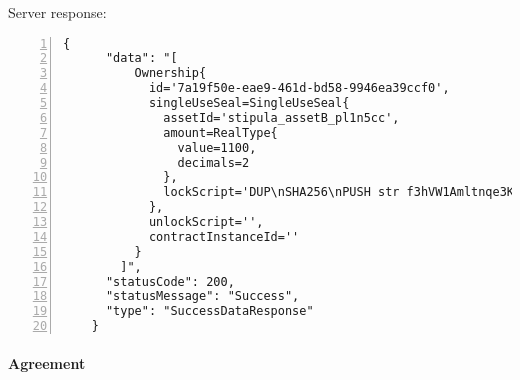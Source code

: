 Server response:
{
  \small
  \begin{Verbatim}[numbers=left,xleftmargin=1cm,firstnumber=1,breaklines=true,breakanywhere=true,tabsize=2]
    {
      "data": "[
          Ownership{
            id='7a19f50e-eae9-461d-bd58-9946ea39ccf0', 
            singleUseSeal=SingleUseSeal{
              assetId='stipula_assetB_pl1n5cc', 
              amount=RealType{
                value=1100, 
                decimals=2
              }, 
              lockScript='DUP\nSHA256\nPUSH str f3hVW1Amltnqe3KvOT00eT7AU23FAUKdgmCluZB+nss=\nEQUAL\nCHECKSIG\nHALT\n'
            }, 
            unlockScript='', 
            contractInstanceId=''
          }
        ]",
      "statusCode": 200,
      "statusMessage": "Success",
      "type": "SuccessDataResponse"
    }
  \end{Verbatim}
}

\paragraph{Agreement}

